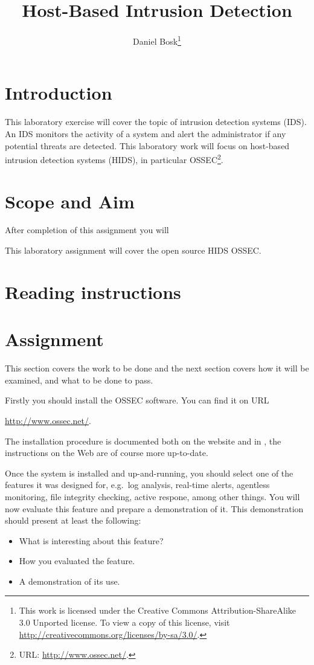 \documentclass[a4paper,nocourse]{miunasgn}
\title{Host-Based Intrusion Detection}
\author{Daniel Bosk\footnote{%
  This work is licensed under the Creative Commons Attribution-ShareAlike 3.0 
  Unported license.
	To view a copy of this license, visit 
	\url{http://creativecommons.org/licenses/by-sa/3.0/}.
}}
\date{\svnId}
\begin{document}
\maketitle
\thispagestyle{foot}
\tableofcontents

\section{Introduction}
\label{sec:intro}
This laboratory exercise will cover the topic of intrusion detection
systems (IDS).
An IDS monitors the activity of a system and alert the administrator if any 
potential threats are detected.
This laboratory work will focus on host-based intrusion detection systems 
(HIDS), in particular OSSEC\footnote{%
  URL: \url{http://www.ossec.net/}.
}.


\section{Scope and Aim}
\label{sec:aim}
After completion of this assignment you will
\begin{itemize}
    
\end{itemize}

This laboratory assignment will cover the open source HIDS OSSEC.


\section{Reading instructions}
\label{sec:reading}



\section{Assignment}
\label{sec:tasks}
This section covers the work to be done and the next section covers how it will 
be examined, and what to be done to pass.

Firstly you should install the OSSEC software.
You can find it on URL
\begin{center}
  \url{http://www.ossec.net/}.
\end{center}
The installation procedure is documented both on the website and in 
\cite{ossec2}, the instructions on the Web are of course more up-to-date.

Once the system is installed and up-and-running, you should select one of the 
features it was designed for, e.g.\ log analysis, real-time alerts, agentless 
monitoring, file integrity checking, active respone, among other things.
You will now evaluate this feature and prepare a demonstration of it.
This demonstration should present at least the following:
\begin{itemize}
  \item What is interesting about this feature?
  \item How you evaluated the feature.
  \item A demonstration of its use.
\end{itemize}
\end{document}
